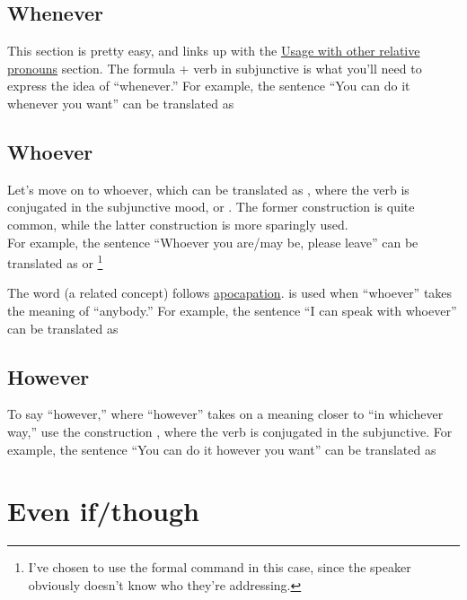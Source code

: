 \subsection{Whenever}

This section is pretty easy, and links up with the \hyperref[sec:relpro]{Usage with other relative pronouns} section.
The formula  + verb in subjunctive is what you'll need to express the idea of ``whenever.'' For example, the sentence ``You can do it whenever you want'' can be translated as 

\subsection{Whoever}
Let's move on to whoever, which can be translated as , where the verb is conjugated in the subjunctive mood, or . The former construction is quite common, while the latter construction is more sparingly used. \\

For example, the sentence  ``Whoever you are/may be, please leave'' can be translated as  or  \footnote{I've chosen to use the formal command in this case, since the speaker obviously doesn't know who they're addressing.} 


The word  (a related concept) follows \hyperref[sec:apo]{apocapation}.  is used when ``whoever'' takes the meaning of ``anybody.'' For example, the sentence ``I can speak with whoever'' can be translated as 

\subsection{However}
To say ``however,'' where ``however'' takes on a meaning closer to ``in whichever way,'' use the construction , where the verb is conjugated in the subjunctive. For example, the sentence ``You can do it however you want'' can be translated as  

\section{Even if/though}

